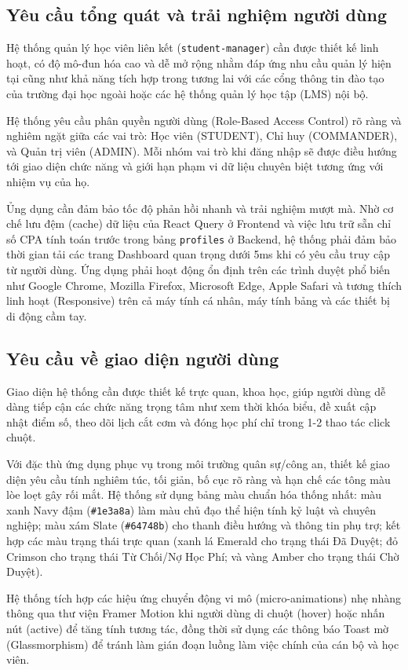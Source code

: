 \documentclass[../DoAn.tex]{subfiles}
\begin{document}
\subsection{Yêu cầu tổng quát và trải nghiệm người dùng}
\label{subsection:2.4.1}
Hệ thống quản lý học viên liên kết (\texttt{student-manager}) cần được thiết kế linh hoạt, có độ mô-đun hóa cao và dễ mở rộng nhằm đáp ứng nhu cầu quản lý hiện tại cũng như khả năng tích hợp trong tương lai với các cổng thông tin đào tạo của trường đại học ngoài hoặc các hệ thống quản lý học tập (LMS) nội bộ.
\par
Hệ thống yêu cầu phân quyền người dùng (Role-Based Access Control) rõ ràng và nghiêm ngặt giữa các vai trò: Học viên (STUDENT), Chỉ huy (COMMANDER), và Quản trị viên (ADMIN). Mỗi nhóm vai trò khi đăng nhập sẽ được điều hướng tới giao diện chức năng và giới hạn phạm vi dữ liệu chuyên biệt tương ứng với nhiệm vụ của họ.
\par
Ủng dụng cần đảm bảo tốc độ phản hồi nhanh và trải nghiệm mượt mà. Nhờ cơ chế lưu đệm (cache) dữ liệu của React Query ở Frontend và việc lưu trữ sẵn chỉ số CPA tính toán trước trong bảng \texttt{profiles} ở Backend, hệ thống phải đảm bảo thời gian tải các trang Dashboard quan trọng dưới 5ms khi có yêu cầu truy cập từ người dùng. Ứng dụng phải hoạt động ổn định trên các trình duyệt phổ biến như Google Chrome, Mozilla Firefox, Microsoft Edge, Apple Safari và tương thích linh hoạt (Responsive) trên cả máy tính cá nhân, máy tính bảng và các thiết bị di động cầm tay.

\subsection{Yêu cầu về giao diện người dùng}
\label{subsection:2.4.2}
Giao diện hệ thống cần được thiết kế trực quan, khoa học, giúp người dùng dễ dàng tiếp cận các chức năng trọng tâm như xem thời khóa biểu, đề xuất cập nhật điểm số, theo dõi lịch cắt cơm và đóng học phí chỉ trong 1-2 thao tác click chuột.
\par
Với đặc thù ứng dụng phục vụ trong môi trường quân sự/công an, thiết kế giao diện yêu cầu tính nghiêm túc, tối giản, bố cục rõ ràng và hạn chế các tông màu lòe loẹt gây rối mắt. Hệ thống sử dụng bảng màu chuẩn hóa thống nhất: màu xanh Navy đậm (\texttt{\#1e3a8a}) làm màu chủ đạo thể hiện tính kỷ luật và chuyên nghiệp; màu xám Slate (\texttt{\#64748b}) cho thanh điều hướng và thông tin phụ trợ; kết hợp các màu trạng thái trực quan (xanh lá Emerald cho trạng thái Đã Duyệt; đỏ Crimson cho trạng thái Từ Chối/Nợ Học Phí; và vàng Amber cho trạng thái Chờ Duyệt).
\par
Hệ thống tích hợp các hiệu ứng chuyển động vi mô (micro-animations) nhẹ nhàng thông qua thư viện Framer Motion khi người dùng di chuột (hover) hoặc nhấn nút (active) để tăng tính tương tác, đồng thời sử dụng các thông báo Toast mờ (Glassmorphism) để tránh làm gián đoạn luồng làm việc chính của cán bộ và học viên.
\end{document}
